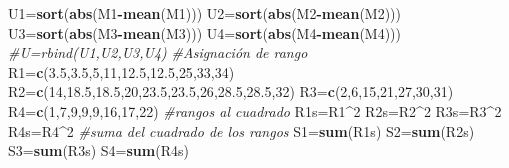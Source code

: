 \documentclass[
  a4paper,
  oneside,
  openany]{book}
\newenvironment{Shaded}{\begin{snugshade}}{\end{snugshade}}
\newcommand{\CommentTok}[1]{\textcolor[rgb]{0.56,0.35,0.01}{\textit{#1}}}
\newcommand{\DecValTok}[1]{\textcolor[rgb]{0.00,0.00,0.81}{#1}}
\newcommand{\FloatTok}[1]{\textcolor[rgb]{0.00,0.00,0.81}{#1}}
\newcommand{\KeywordTok}[1]{\textcolor[rgb]{0.13,0.29,0.53}{\textbf{#1}}}
\newcommand{\NormalTok}[1]{#1}
\newcommand{\OperatorTok}[1]{\textcolor[rgb]{0.81,0.36,0.00}{\textbf{#1}}}
\begin{document}
\begin{Shaded}
\begin{Highlighting}[]
\NormalTok{U1=}\KeywordTok{sort}\NormalTok{(}\KeywordTok{abs}\NormalTok{(M1}\OperatorTok{{-}}\KeywordTok{mean}\NormalTok{(M1)))}
\NormalTok{U2=}\KeywordTok{sort}\NormalTok{(}\KeywordTok{abs}\NormalTok{(M2}\OperatorTok{{-}}\KeywordTok{mean}\NormalTok{(M2)))}
\NormalTok{U3=}\KeywordTok{sort}\NormalTok{(}\KeywordTok{abs}\NormalTok{(M3}\OperatorTok{{-}}\KeywordTok{mean}\NormalTok{(M3)))}
\NormalTok{U4=}\KeywordTok{sort}\NormalTok{(}\KeywordTok{abs}\NormalTok{(M4}\OperatorTok{{-}}\KeywordTok{mean}\NormalTok{(M4)))}
\CommentTok{\#U=rbind(U1,U2,U3,U4)}
\CommentTok{\#Asignación de rango}
\NormalTok{R1=}\KeywordTok{c}\NormalTok{(}\FloatTok{3.5}\NormalTok{,}\FloatTok{3.5}\NormalTok{,}\DecValTok{5}\NormalTok{,}\DecValTok{11}\NormalTok{,}\FloatTok{12.5}\NormalTok{,}\FloatTok{12.5}\NormalTok{,}\DecValTok{25}\NormalTok{,}\DecValTok{33}\NormalTok{,}\DecValTok{34}\NormalTok{)}
\NormalTok{R2=}\KeywordTok{c}\NormalTok{(}\DecValTok{14}\NormalTok{,}\FloatTok{18.5}\NormalTok{,}\FloatTok{18.5}\NormalTok{,}\DecValTok{20}\NormalTok{,}\FloatTok{23.5}\NormalTok{,}\FloatTok{23.5}\NormalTok{,}\DecValTok{26}\NormalTok{,}\FloatTok{28.5}\NormalTok{,}\FloatTok{28.5}\NormalTok{,}\DecValTok{32}\NormalTok{)}
\NormalTok{R3=}\KeywordTok{c}\NormalTok{(}\DecValTok{2}\NormalTok{,}\DecValTok{6}\NormalTok{,}\DecValTok{15}\NormalTok{,}\DecValTok{21}\NormalTok{,}\DecValTok{27}\NormalTok{,}\DecValTok{30}\NormalTok{,}\DecValTok{31}\NormalTok{)}
\NormalTok{R4=}\KeywordTok{c}\NormalTok{(}\DecValTok{1}\NormalTok{,}\DecValTok{7}\NormalTok{,}\DecValTok{9}\NormalTok{,}\DecValTok{9}\NormalTok{,}\DecValTok{9}\NormalTok{,}\DecValTok{16}\NormalTok{,}\DecValTok{17}\NormalTok{,}\DecValTok{22}\NormalTok{)}
\CommentTok{\#rangos al cuadrado}
\NormalTok{R1s=R1}\OperatorTok{\^{}}\DecValTok{2}
\NormalTok{R2s=R2}\OperatorTok{\^{}}\DecValTok{2}
\NormalTok{R3s=R3}\OperatorTok{\^{}}\DecValTok{2}
\NormalTok{R4s=R4}\OperatorTok{\^{}}\DecValTok{2}
\CommentTok{\#suma del cuadrado de los rangos}
\NormalTok{S1=}\KeywordTok{sum}\NormalTok{(R1s)}
\NormalTok{S2=}\KeywordTok{sum}\NormalTok{(R2s)}
\NormalTok{S3=}\KeywordTok{sum}\NormalTok{(R3s)}
\NormalTok{S4=}\KeywordTok{sum}\NormalTok{(R4s)}


\end{Highlighting}
\end{Shaded}
\end{document}
